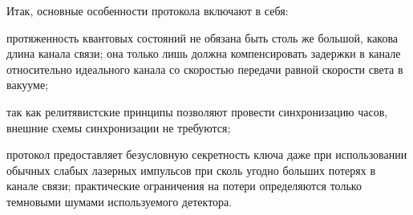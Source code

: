 Итак, основные особенности протокола включают в себя: 
\begin{inparaenum}[\itshape 1\upshape)]
\item протяженность квантовых состояний не обязана быть столь же большой, какова длина канала связи; она только лишь должна компенсировать задержки в канале относительно идеального канала со скоростью передачи равной скорости света в вакууме;
\item так как релитявистские принципы позволяют провести синхронизацию часов, внешние схемы синхронизации не требуются;
\item протокол предоставляет безусловную секретность ключа даже при использовании обычных слабых лазерных импульсов при сколь угодно больших потерях в канале связи; практические ограничения на потери определяются только темновыми шумами используемого детектора.
\end{inparaenum}
\clearpage